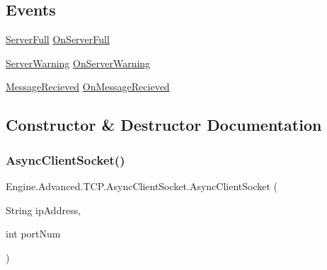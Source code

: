 \subsection*{Events}
\begin{DoxyCompactItemize}
\item 
\mbox{\hyperlink{class_engine_1_1_advanced_1_1_t_c_p_1_1_async_client_socket_a992805398f43802c511b8f40a9344254}{Server\+Full}} \mbox{\hyperlink{class_engine_1_1_advanced_1_1_t_c_p_1_1_async_client_socket_a0330914885ed26c4d61b7c438260db7d}{On\+Server\+Full}}
\item 
\mbox{\hyperlink{class_engine_1_1_advanced_1_1_t_c_p_1_1_async_client_socket_a519c68733927ee8465d4d38726c137f8}{Server\+Warning}} \mbox{\hyperlink{class_engine_1_1_advanced_1_1_t_c_p_1_1_async_client_socket_ac7907c405f3df4e630fade199c29fe95}{On\+Server\+Warning}}
\item 
\mbox{\hyperlink{class_engine_1_1_advanced_1_1_t_c_p_1_1_async_client_socket_a901d0df6f647e9d477a6d46be0865662}{Message\+Recieved}} \mbox{\hyperlink{class_engine_1_1_advanced_1_1_t_c_p_1_1_async_client_socket_a44a532b35399e92a3caa0270d1cd9240}{On\+Message\+Recieved}}
\end{DoxyCompactItemize}


\subsection{Constructor \& Destructor Documentation}
\mbox{\label{class_engine_1_1_advanced_1_1_t_c_p_1_1_async_client_socket_aa9ea42a5946a7ac0853912e49c82413b}} 
\subsubsection{\texorpdfstring{AsyncClientSocket()}{AsyncClientSocket()}}
{\footnotesize\ttfamily Engine.\+Advanced.\+T\+C\+P.\+Async\+Client\+Socket.\+Async\+Client\+Socket (\begin{DoxyParamCaption}\item[{String}]{ip\+Address,  }\item[{int}]{port\+Num }\end{DoxyParamCaption})}



